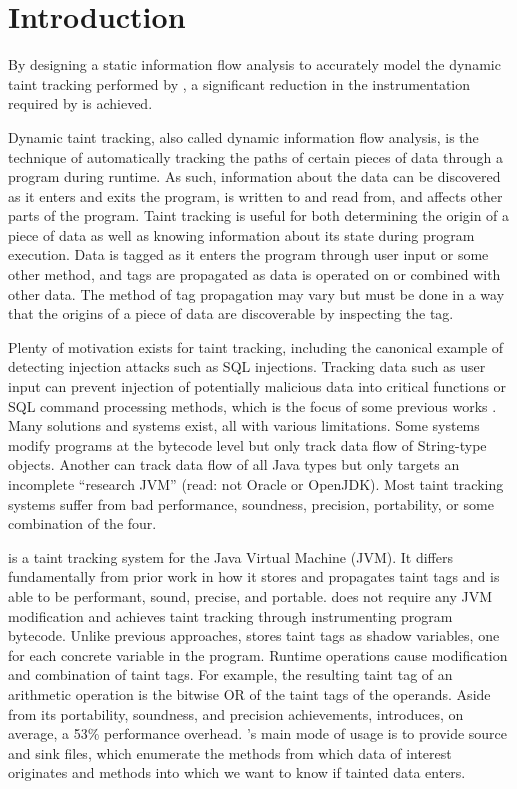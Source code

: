 \chapter{Introduction}

By designing a static information flow analysis to accurately model
the dynamic taint tracking performed by \phosphor{}, a significant
reduction in the instrumentation required by \phosphor{} is achieved.

Dynamic taint tracking, also called dynamic information flow analysis,
is the technique of automatically tracking the paths of certain pieces
of data through a program during runtime. As such, information about
the data can be discovered as it enters and exits the program, is
written to and read from, and affects other parts of the
program. Taint tracking is useful for both determining the origin of a
piece of data as well as knowing information about its state during
program execution. Data is tagged as it enters the program through
user input or some other method, and tags are propagated as data is
operated on or combined with other data. The method of tag propagation
may vary but must be done in a way that the origins of a piece of data
are discoverable by inspecting the tag.

Plenty of motivation exists for taint tracking, including the
canonical example of detecting injection attacks such as SQL
injections. Tracking data such as user input can prevent injection of
potentially malicious data into critical functions or SQL command
processing methods, which is the focus of some previous works
\cite{sql1} \cite{sql2}. Many solutions and systems exist, all with
various limitations. Some systems \cite{stringtaint} \cite{sql1} modify
programs at the bytecode level but only track data flow of String-type
objects. Another \cite{jikes} can track data flow of all Java types
but only targets an incomplete ``research JVM'' (read: not Oracle or
OpenJDK).  Most taint tracking systems suffer from bad performance,
soundness, precision, portability, or some combination of the four.

\phosphor{} \cite{phosphor_oopsla} is a taint tracking system for the
Java Virtual Machine (JVM). It differs fundamentally from prior work
in how it stores and propagates taint tags and is able to be
performant, sound, precise, and portable. \phosphor{} does not require
any JVM modification and achieves taint tracking through instrumenting
program bytecode. Unlike previous approaches, \phosphor{} stores taint
tags as shadow variables, one for each concrete variable in the
program. Runtime operations cause modification and combination of
taint tags. For example, the resulting taint tag of an arithmetic
operation is the bitwise OR of the taint tags of the operands. Aside
from its portability, soundness, and precision achievements, \phosphor{}
introduces, on average, a 53\% performance overhead. \phosphor{}'s main
mode of usage is to provide source and sink files, which enumerate the
methods from which data of interest originates and methods into which
we want to know if tainted data enters.

